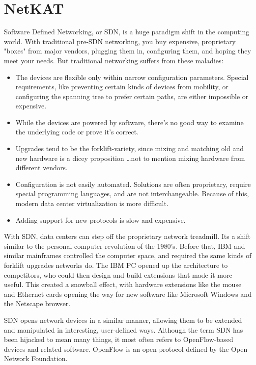 
\chapter{NetKAT}

Software Defined Networking, or SDN, is a huge paradigm shift in the computing world.  
With traditional pre-SDN networking, you buy 
expensive, proprietary "boxes" from major vendors, plugging them in, configuring them, and hoping they 
meet your needs.  
But traditional networking suffers from these maladies:

\begin{itemize}
\item The devices are flexible only within narrow configuration parameters. 
Special requirements, like preventing certain kinds of devices from mobility, or configuring 
the spanning tree to prefer certain paths, are either impossible or expensive.
\item While the devices are powered by software, there's no good way to examine the underlying code or prove it's correct.  
\item Upgrades tend to be the forklift-variety, since mixing and matching old and new hardware is a dicey proposition
\ldots not to mention mixing hardware from different vendors.
\item Configuration is not easily automated. 
Solutions are often proprietary, require special programming languages, and are not interchangeable.
Because of this, modern data center virtualization is more difficult.
\item Adding support for new protocols is slow and expensive.
\end{itemize}

With SDN, data centers can step off the proprietary network treadmill.  
Its a shift similar to the personal computer revolution of the 1980's.
Before that, IBM and similar mainframes controlled the computer space, and required the same kinds of 
forklift upgrades networks do.
The IBM PC opened up the architecture to competitors, who could then design and 
build extensions
that made it more useful.
This created a snowball effect, with hardware extensions like the mouse and Ethernet cards opening the way 
for new software like Microsoft Windows and the Netscape browser.

SDN opens network devices in a similar manner, allowing them to be extended and manipulated in interesting,
user-defined ways.
Although the term SDN has been hijacked to mean many things, it most often refers to OpenFlow-based
devices and related software.
OpenFlow is an open protocol defined by the Open Network Foundation.

